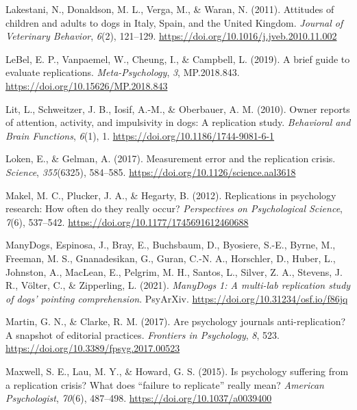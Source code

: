 \documentclass[
  pub,floatsintext]{apa6}
\newlength{\cslhangindent}
\newlength{\cslentryspacingunit} %
\newenvironment{CSLReferences}[2] %
 {%
  \setlength{\parindent}{0pt}
  \ifodd #1
  \let\oldpar\par
  \def\par{\hangindent=\cslhangindent\oldpar}
  \fi
  \setlength{\parskip}{#2\cslentryspacingunit}
 }%
 {}
\begin{document}
\begin{CSLReferences}{1}{0}
\leavevmode{}%
Lakestani, N., Donaldson, M. L., Verga, M., \& Waran, N. (2011). Attitudes of children and adults to dogs in {Italy}, {Spain}, and the {United Kingdom}. \emph{Journal of Veterinary Behavior}, \emph{6}(2), 121--129. \url{https://doi.org/10.1016/j.jveb.2010.11.002}

\leavevmode{}%
LeBel, E. P., Vanpaemel, W., Cheung, I., \& Campbell, L. (2019). A brief guide to evaluate replications. \emph{Meta-Psychology}, \emph{3}, MP.2018.843. \url{https://doi.org/10.15626/MP.2018.843}

\leavevmode{}%
Lit, L., Schweitzer, J. B., Iosif, A.-M., \& Oberbauer, A. M. (2010). Owner reports of attention, activity, and impulsivity in dogs: A replication study. \emph{Behavioral and Brain Functions}, \emph{6}(1), 1. \url{https://doi.org/10.1186/1744-9081-6-1}

\leavevmode{}%
Loken, E., \& Gelman, A. (2017). Measurement error and the replication crisis. \emph{Science}, \emph{355}(6325), 584--585. \url{https://doi.org/10.1126/science.aal3618}

\leavevmode{}%
Makel, M. C., Plucker, J. A., \& Hegarty, B. (2012). Replications in psychology research: How often do they really occur? \emph{Perspectives on Psychological Science}, \emph{7}(6), 537--542. \url{https://doi.org/10.1177/1745691612460688}

\leavevmode{}%
ManyDogs, Espinosa, J., Bray, E., Buchsbaum, D., Byosiere, S.-E., Byrne, M., Freeman, M. S., Gnanadesikan, G., Guran, C.-N. A., Horschler, D., Huber, L., Johnston, A., MacLean, E., Pelgrim, M. H., Santos, L., Silver, Z. A., Stevens, J. R., Völter, C., \& Zipperling, L. (2021). \emph{{ManyDogs} 1: {A} multi-lab replication study of dogs' pointing comprehension}. {PsyArXiv}. \url{https://doi.org/10.31234/osf.io/f86jq}

\leavevmode{}%
Martin, G. N., \& Clarke, R. M. (2017). Are psychology journals anti-replication? {A} snapshot of editorial practices. \emph{Frontiers in Psychology}, \emph{8}, 523. \url{https://doi.org/10.3389/fpsyg.2017.00523}

\leavevmode{}%
Maxwell, S. E., Lau, M. Y., \& Howard, G. S. (2015). Is psychology suffering from a replication crisis? {What} does {``failure to replicate''} really mean? \emph{American Psychologist}, \emph{70}(6), 487--498. \url{https://doi.org/10.1037/a0039400}


\end{CSLReferences}
\end{document}

